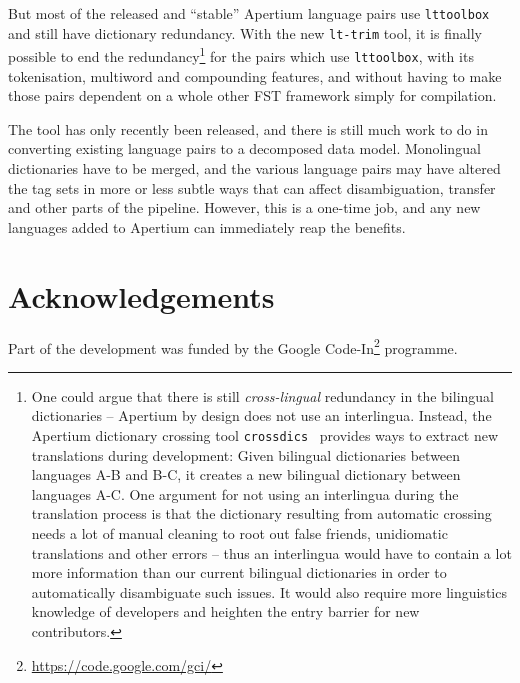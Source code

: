 \documentclass[10pt, a4paper]{article}
\newcommand{\tool}[1]{\texttt{#1}}
\begin{document}
But most of the released and ``stable'' Apertium language pairs use
\tool{lttoolbox} and still have dictionary redundancy. With the new
\tool{lt-trim} tool, it is finally possible to end the
redundancy\footnote{One could argue that there is still
  \emph{cross-lingual} redundancy in the bilingual dictionaries --
  Apertium by design does not use an interlingua. Instead, the
  Apertium dictionary crossing tool
  \tool{crossdics}~\cite{toral2011crossdics-it-ca} provides ways to
  extract new translations during development: Given bilingual
  dictionaries between languages A-B and B-C, it creates a new
  bilingual dictionary between languages A-C. One argument for not
  using an interlingua during the translation process is that the
  dictionary resulting from automatic crossing needs a lot of manual
  cleaning to root out false friends, unidiomatic translations and
  other errors -- thus an interlingua would have to contain a lot more
  information than our current bilingual dictionaries in order to
  automatically disambiguate such issues. It would also require more
  linguistics knowledge of developers and heighten the entry barrier
  for new contributors.} for the pairs which use \tool{lttoolbox},
with its tokenisation, multiword and compounding features, and without
having to make those pairs dependent on a whole other FST framework
simply for compilation.

The tool has only recently been released, and there is still much work
to do in converting existing language pairs to a decomposed data
model. Monolingual dictionaries have to be merged, and the various
language pairs may have altered the tag sets in more or less subtle
ways that can affect disambiguation, transfer and other parts of the
pipeline. However, this is a one-time job, and any new languages added
to Apertium can immediately reap the benefits.

\section*{Acknowledgements}
Part of the development was funded by the Google
Code-In\footnote{\href{https://code.google.com/gci/}{https://code.google.com/gci/}} programme.



\end{document}
